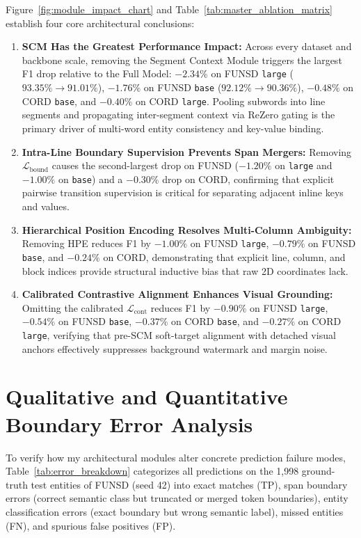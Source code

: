 Figure~\ref{fig:module_impact_chart} and Table~\ref{tab:master_ablation_matrix} establish four core architectural conclusions:
\begin{enumerate}[leftmargin=*]
    \item \textbf{SCM Has the Greatest Performance Impact:}
    Across every dataset and backbone scale, removing the Segment Context Module triggers the largest F1 drop relative to the Full Model: $\mathbf{-2.34\%}$ on FUNSD \texttt{large} ($93.35\% \to 91.01\%$), $\mathbf{-1.76\%}$ on FUNSD \texttt{base} ($92.12\% \to 90.36\%$), $\mathbf{-0.48\%}$ on CORD \texttt{base}, and $\mathbf{-0.40\%}$ on CORD \texttt{large}. Pooling subwords into line segments and propagating inter-segment context via ReZero gating is the primary driver of multi-word entity consistency and key-value binding.
    \item \textbf{Intra-Line Boundary Supervision Prevents Span Mergers:}
    Removing $\mathcal{L}_{\text{bound}}$ causes the second-largest drop on FUNSD ($\mathbf{-1.20\%}$ on \texttt{large} and $\mathbf{-1.00\%}$ on \texttt{base}) and a $\mathbf{-0.30\%}$ drop on CORD, confirming that explicit pairwise transition supervision is critical for separating adjacent inline keys and values.
    \item \textbf{Hierarchical Position Encoding Resolves Multi-Column Ambiguity:}
    Removing HPE reduces F1 by $\mathbf{-1.00\%}$ on FUNSD \texttt{large}, $\mathbf{-0.79\%}$ on FUNSD \texttt{base}, and $\mathbf{-0.24\%}$ on CORD, demonstrating that explicit line, column, and block indices provide structural inductive bias that raw 2D coordinates lack.
    \item \textbf{Calibrated Contrastive Alignment Enhances Visual Grounding:}
    Omitting the calibrated $\mathcal{L}_{\text{cont}}$ reduces F1 by $\mathbf{-0.90\%}$ on FUNSD \texttt{large}, $\mathbf{-0.54\%}$ on FUNSD \texttt{base}, $\mathbf{-0.37\%}$ on CORD \texttt{base}, and $\mathbf{-0.27\%}$ on CORD \texttt{large}, verifying that pre-SCM soft-target alignment with detached visual anchors effectively suppresses background watermark and margin noise.
\end{enumerate}

\section{Qualitative and Quantitative Boundary Error Analysis}
\label{subsec:error_analysis}

To verify how my architectural modules alter concrete prediction failure modes, Table~\ref{tab:error_breakdown} categorizes all predictions on the 1,998 ground-truth test entities of FUNSD (seed 42) into exact matches (TP), span boundary errors (correct semantic class but truncated or merged token boundaries), entity classification errors (exact boundary but wrong semantic label), missed entities (FN), and spurious false positives (FP).

